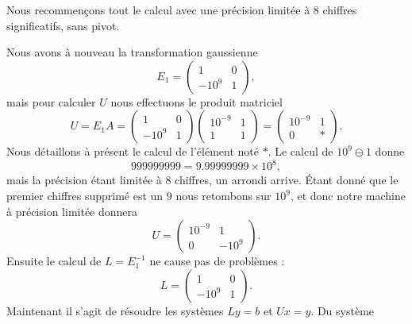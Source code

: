 \begin{example}     \label{EXooNVRNooJgQmQc}
	Nous recommençons tout le calcul avec une précision limitée à \( 8\) chiffres significatifs, sans pivot.

	Nous avons à nouveau la transformation gaussienne
	\begin{equation}
		E_1=\begin{pmatrix}
			1     & 0 \\
			-10^9 & 1
		\end{pmatrix},
	\end{equation}
	mais pour calculer \( U\) nous effectuons le produit matriciel
	\begin{equation}
		U=E_1A=\begin{pmatrix}
			1     & 0 \\
			-10^9 & 1
		\end{pmatrix}\begin{pmatrix}
			10^{-9} & 1 \\
			1       & 1
		\end{pmatrix}=\begin{pmatrix}
			10^{-9} & 1 \\
			0       & *
		\end{pmatrix}.
	\end{equation}
	Nous détaillons à présent le calcul de l'élément noté \( *\). Le calcul de \( 10^9\ominus 1\) donne
	\begin{equation}
		999999999=9.99999999\times 10^{8},
	\end{equation}
	mais la précision étant limitée à \( 8\) chiffres, un arrondi arrive. Étant donné que le premier chiffres supprimé est un \( 9\) nous retombons sur \( 10^9\), et donc notre machine à précision limitée donnera
	\begin{equation}
		U=\begin{pmatrix}
			10^{-9} & 1       \\
			0       & -10^{9}
		\end{pmatrix}.
	\end{equation}
	Ensuite le calcul de \( L=E_1^{-1}\) ne cause pas de problèmes :
	\begin{equation}
		L=\begin{pmatrix}
			1     & 0 \\
			-10^9 & 1
		\end{pmatrix}.
	\end{equation}
	Maintenant il s'agit de résoudre les systèmes \( Ly=b\) et \( Ux=y\). Du système
	\begin{equation}

\end{equation}
\end{example}
